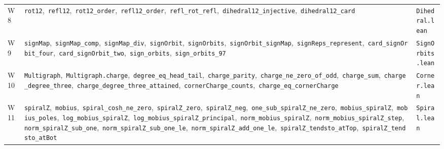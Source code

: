 \documentclass[11pt,a4paper]{article}
\theoremstyle{definition}
\begin{document}
{\begin{longtable}{@{}l>{\raggedright\arraybackslash}p{}l@{}}
W8 & \texttt{rot12},\allowbreak\ \texttt{refl12},\allowbreak\ \texttt{rot12\_order},\allowbreak\ \texttt{refl12\_order},\allowbreak\ \texttt{refl\_rot\_refl},\allowbreak\ \texttt{dihedral12\_injective},\allowbreak\ \texttt{dihedral12\_card} & \texttt{Dihedral.lean}\\
W9 & \texttt{signMap},\allowbreak\ \texttt{signMap\_comp},\allowbreak\ \texttt{signMap\_div},\allowbreak\ \texttt{signOrbit},\allowbreak\ \texttt{signOrbits},\allowbreak\ \texttt{signOrbit\_signMap},\allowbreak\ \texttt{signReps\_represent},\allowbreak\ \texttt{card\_signOrbit\_four},\allowbreak\ \texttt{card\_signOrbit\_two},\allowbreak\ \texttt{sign\_orbits},\allowbreak\ \texttt{sign\_orbits\_97} & \texttt{SignOrbits.lean}\\
W10 & \texttt{Multigraph},\allowbreak\ \texttt{Multigraph.charge},\allowbreak\ \texttt{degree\_eq\_head\_tail},\allowbreak\ \texttt{charge\_parity},\allowbreak\ \texttt{charge\_ne\_zero\_of\_odd},\allowbreak\ \texttt{charge\_sum},\allowbreak\ \texttt{charge\_degree\_three},\allowbreak\ \texttt{charge\_degree\_three\_attained},\allowbreak\ \texttt{cornerCharge\_counts},\allowbreak\ \texttt{charge\_eq\_cornerCharge} & \texttt{Corner.lean}\\
W11 & \texttt{spiralZ},\allowbreak\ \texttt{mobius},\allowbreak\ \texttt{spiral\_cosh\_ne\_zero},\allowbreak\ \texttt{spiralZ\_zero},\allowbreak\ \texttt{spiralZ\_neg},\allowbreak\ \texttt{one\_sub\_spiralZ\_ne\_zero},\allowbreak\ \texttt{mobius\_spiralZ},\allowbreak\ \texttt{mobius\_poles},\allowbreak\ \texttt{log\_mobius\_spiralZ},\allowbreak\ \texttt{log\_mobius\_spiralZ\_principal},\allowbreak\ \texttt{norm\_mobius\_spiralZ},\allowbreak\ \texttt{norm\_mobius\_spiralZ\_step},\allowbreak\ \texttt{norm\_spiralZ\_sub\_one},\allowbreak\ \texttt{norm\_spiralZ\_sub\_one\_le},\allowbreak\ \texttt{norm\_spiralZ\_add\_one\_le},\allowbreak\ \texttt{spiralZ\_tendsto\_atTop},\allowbreak\ \texttt{spiralZ\_tendsto\_atBot} & \texttt{Spiral.lean}\\
\end{longtable}
}
\end{document}
